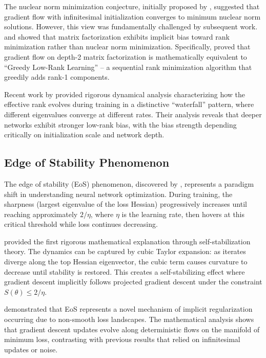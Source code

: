 \documentclass[11pt]{article}
\begin{document}
The nuclear norm minimization conjecture, initially proposed by \citet{gunasekar2017implicit}, suggested that gradient flow with infinitesimal initialization converges to minimum nuclear norm solutions. However, this view was fundamentally challenged by subsequent work. \citet{arora2019implicit} and \citet{li2020towards} showed that matrix factorization exhibits implicit bias toward rank minimization rather than nuclear norm minimization. Specifically, \citet{li2020towards} proved that gradient flow on depth-2 matrix factorization is mathematically equivalent to ``Greedy Low-Rank Learning'' -- a sequential rank minimization algorithm that greedily adds rank-1 components.

Recent work by \citet{chou2024gradient} provided rigorous dynamical analysis characterizing how the effective rank evolves during training in a distinctive ``waterfall'' pattern, where different eigenvalues converge at different rates. Their analysis reveals that deeper networks exhibit stronger low-rank bias, with the bias strength depending critically on initialization scale and network depth.

\subsection{Edge of Stability Phenomenon}

The edge of stability (EoS) phenomenon, discovered by \citet{cohen2021gradient}, represents a paradigm shift in understanding neural network optimization. During training, the sharpness (largest eigenvalue of the loss Hessian) progressively increases until reaching approximately $2/\eta$, where $\eta$ is the learning rate, then hovers at this critical threshold while loss continues decreasing.

\citet{damian2022self} provided the first rigorous mathematical explanation through self-stabilization theory. The dynamics can be captured by cubic Taylor expansion: as iterates diverge along the top Hessian eigenvector, the cubic term causes curvature to decrease until stability is restored. This creates a self-stabilizing effect where gradient descent implicitly follows projected gradient descent under the constraint $S(\theta) \leq 2/\eta$.

\citet{arora2022understanding} demonstrated that EoS represents a novel mechanism of implicit regularization occurring due to non-smooth loss landscapes. The mathematical analysis shows that gradient descent updates evolve along deterministic flows on the manifold of minimum loss, contrasting with previous results that relied on infinitesimal updates or noise.
\end{document}
